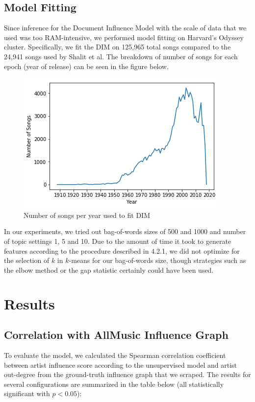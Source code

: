 \subsection{Model Fitting}
Since inference for the Document Influence Model with the scale of data that we used was too RAM-intensive, we performed model fitting on Harvard's Odyssey cluster. Specifically, we fit the DIM on 125,965 total songs compared to the 24,941 songs used by Shalit et al. The breakdown of number of songs for each epoch (year of release) can be seen in the figure below. 

\begin{figure}[H]
\includegraphics[width=\textwidth]{figures/dim_songs_epoch.png}
\caption{Number of songs per year used to fit DIM}
\end{figure}

In our experiments, we tried out bag-of-words sizes of 500 and 1000 and number of topic settings 1, 5 and 10. Due to the amount of time it took to generate features according to the procedure described in 4.2.1, we did not optimize for the selection of $k$ in $k$-means for our bag-of-words size, though strategies such as the elbow method or the gap statistic \cite{tibshirani2001estimating} certainly could have been used.

\section{Results}
\subsection{Correlation with AllMusic Influence Graph}
To evaluate the model, we calculated the Spearman correlation coefficient between artist influence score according to the unsupervised model and artist out-degree from the ground-truth influence graph that we scraped. The results for several configurations are summarized in the table below (all statistically significant with $p < 0.05$):

